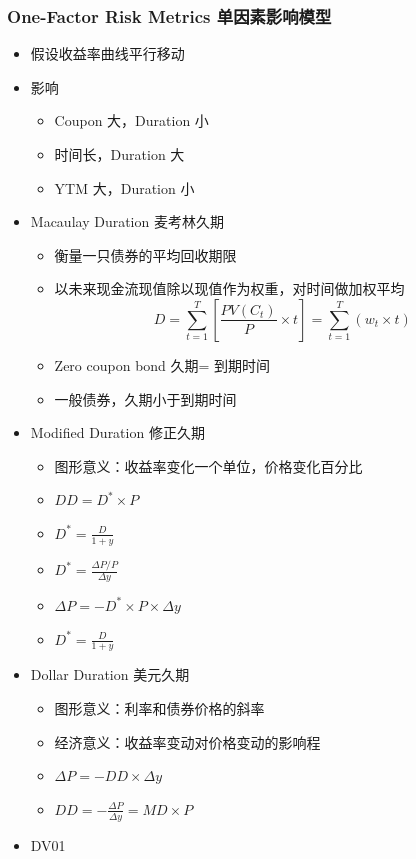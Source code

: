 \documentclass[a4paper,6pt,twoside,openany]{article}
\begin{document}
\subsubsection{One-Factor Risk Metrics 单因素影响模型}
\begin{itemize}
\item 假设收益率曲线平行移动
\item 影响
  \begin{itemize}
  \item Coupon 大，Duration 小
  \item 时间长，Duration 大
  \item YTM 大，Duration 小
  \end{itemize}
\item Macaulay Duration 麦考林久期
  \begin{itemize}
  \item 衡量一只债券的平均回收期限
  \item 以未来现金流现值除以现值作为权重，对时间做加权平均
    $$D = \sum_{t=1}^T[\frac{PV(C_t)}{P} \times t] = \sum_{t=1}^T (w_t \times t)$$
  \item Zero coupon bond 久期= 到期时间
  \item 一般债券，久期小于到期时间
  \end{itemize}
\item Modified Duration 修正久期
  \begin{itemize}
  \item 图形意义：收益率变化一个单位，价格变化百分比
  \item $DD = D^* \times P$
  \item $D^* = \frac{D}{1 + y}$
  \item $D^* = \frac{\Delta P / P}{\Delta y}$
  \item $\Delta P = -D^* \times P \times \Delta y $
  \item $D^* = \frac{D}{1 + y}$
  \end{itemize}
\item Dollar Duration 美元久期
  \begin{itemize}
  \item 图形意义：利率和债券价格的斜率
  \item 经济意义：收益率变动对价格变动的影响程
  \item $\Delta P = -DD \times \Delta y $
  \item $DD = -\frac{\Delta P}{\Delta y} = MD \times P$
  \end{itemize}
\item DV01
  \begin{itemize}

\end{itemize}
\end{itemize}
\end{document}
